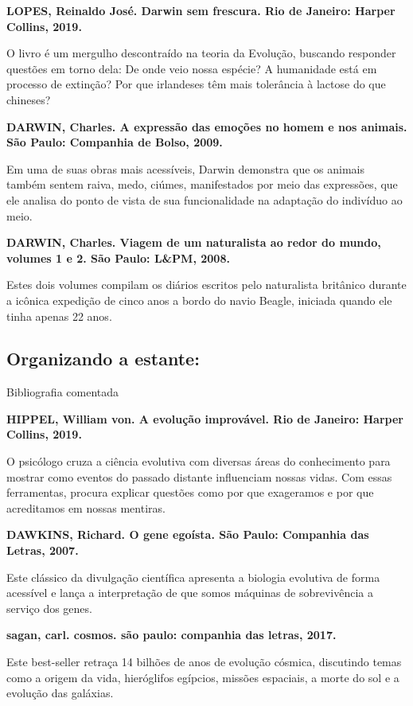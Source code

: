 \documentclass[12pt]{extarticle}
\begin{document}
\textbf{LOPES, Reinaldo José. Darwin sem frescura. Rio de Janeiro:
Harper Collins, 2019.}

O livro é um mergulho descontraído na teoria da Evolução, buscando
responder questões em torno dela: De onde veio nossa espécie? A
humanidade está em processo de extinção? Por que irlandeses têm mais
tolerância à lactose do que chineses?

\textbf{DARWIN, Charles. A expressão das emoções no homem e nos animais.
São Paulo: Companhia de Bolso, 2009.}

Em uma de suas obras mais acessíveis, Darwin demonstra que os animais
também sentem raiva, medo, ciúmes, manifestados por meio das expressões,
que ele analisa do ponto de vista de sua funcionalidade na adaptação do
indivíduo ao meio.

\textbf{DARWIN, Charles. Viagem de um naturalista ao redor do mundo,
volumes 1 e 2. São Paulo: L\&PM, 2008.}

Estes dois volumes compilam os diários escritos pelo naturalista
britânico durante a icônica expedição de cinco anos a bordo do navio
Beagle, iniciada quando ele tinha apenas 22 anos.

\subsection{Organizando a estante:} Bibliografia comentada

\textbf{HIPPEL, William von. A evolução improvável. Rio de Janeiro:
Harper Collins, 2019.}

O psicólogo cruza a ciência evolutiva com diversas áreas do conhecimento
para mostrar como eventos do passado distante influenciam nossas vidas.
Com essas ferramentas, procura explicar questões como por que exageramos
e por que acreditamos em nossas mentiras.

\textbf{DAWKINS, Richard. O gene egoísta. São Paulo: Companhia das
Letras, 2007.}

Este clássico da divulgação científica apresenta a biologia evolutiva de
forma acessível e lança a interpretação de que somos máquinas de
sobrevivência a serviço dos genes.

\textbf{sagan, carl. cosmos. são paulo: companhia das letras, 2017.}

Este best-seller retraça 14 bilhões de anos de evolução cósmica,
discutindo temas como a origem da vida, hieróglifos egípcios, missões
espaciais, a morte do sol e a evolução das galáxias.
\end{document}
